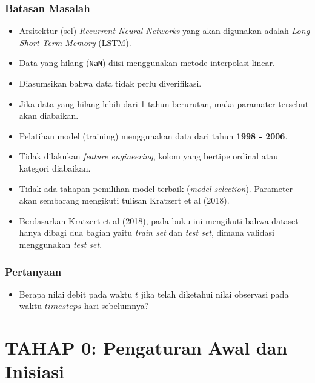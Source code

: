 \documentclass[11pt]{article}
\providecommand{\tightlist}{%
      \setlength{\itemsep}{0pt}\setlength{\parskip}{0pt}}
\let\oldsection\section
\renewcommand\section{\clearpage\oldsection}
\begin{document}
\hypertarget{batasan-masalah}{%
\subsubsection{Batasan Masalah}\label{batasan-masalah}}

\begin{itemize}
\tightlist
\item
  Arsitektur (sel) \emph{Recurrent Neural Networks} yang akan digunakan
  adalah \emph{Long Short-Term Memory} (LSTM).
\item
  Data yang hilang (\texttt{NaN}) diisi menggunakan metode interpolasi
  linear.
\item
  Diasumsikan bahwa data tidak perlu diverifikasi.
\item
  Jika data yang hilang lebih dari 1 tahun berurutan, maka paramater
  tersebut akan diabaikan.
\item
  Pelatihan model (training) menggunakan data dari tahun \textbf{1998 -
  2006}.
\item
  Tidak dilakukan \emph{feature engineering}, kolom yang bertipe ordinal
  atau kategori diabaikan.
\item
  Tidak ada tahapan pemilihan model terbaik (\emph{model selection}).
  Parameter akan sembarang mengikuti tulisan Kratzert et al (2018).
\item
  Berdasarkan Kratzert et al (2018), pada buku ini mengikuti bahwa
  dataset hanya dibagi dua bagian yaitu \emph{train set} dan \emph{test
  set}, dimana validasi menggunakan \emph{test set}.
\end{itemize}

\hypertarget{pertanyaan}{%
\subsubsection{Pertanyaan}\label{pertanyaan}}

\begin{itemize}
\tightlist
\item
  Berapa nilai debit pada waktu \(t\) jika telah diketahui nilai
  observasi pada waktu \(timesteps\) hari sebelumnya?
\end{itemize}

    \hypertarget{tahap-0-pengaturan-awal-dan-inisiasi}{%
\section{TAHAP 0: Pengaturan Awal dan
Inisiasi}\label{tahap-0-pengaturan-awal-dan-inisiasi}}
\end{document}
